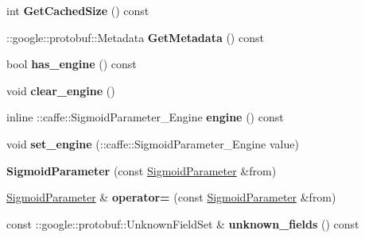 \begin{DoxyCompactItemize}
int {\bfseries Get\+Cached\+Size} () const
\item 
\mbox{\label{classcaffe_1_1_sigmoid_parameter_a2b3a653a54f11702c7f79e3bed8c89cb}} 
\+::google\+::protobuf\+::\+Metadata {\bfseries Get\+Metadata} () const
\item 
\mbox{\label{classcaffe_1_1_sigmoid_parameter_aeba70eb092ec6c6f8a6f11cd657e143a}} 
bool {\bfseries has\+\_\+engine} () const
\item 
\mbox{\label{classcaffe_1_1_sigmoid_parameter_ab72d71d79d429c9d44caaf5b04d416d6}} 
void {\bfseries clear\+\_\+engine} ()
\item 
\mbox{\label{classcaffe_1_1_sigmoid_parameter_ac78bd9e1972d5a975b813963732ba9e7}} 
inline \+::caffe\+::\+Sigmoid\+Parameter\+\_\+\+Engine {\bfseries engine} () const
\item 
\mbox{\label{classcaffe_1_1_sigmoid_parameter_a0a6e99825d8d1c37d639ecb4d7f2076a}} 
void {\bfseries set\+\_\+engine} (\+::caffe\+::\+Sigmoid\+Parameter\+\_\+\+Engine value)
\item 
\mbox{\label{classcaffe_1_1_sigmoid_parameter_af89f84687c02c29e0fef17f4d78ea37e}} 
{\bfseries Sigmoid\+Parameter} (const \mbox{\hyperlink{classcaffe_1_1_sigmoid_parameter}{Sigmoid\+Parameter}} \&from)
\item 
\mbox{\label{classcaffe_1_1_sigmoid_parameter_ac819b7f4f559ad9ecad92d5bd06bb740}} 
\mbox{\hyperlink{classcaffe_1_1_sigmoid_parameter}{Sigmoid\+Parameter}} \& {\bfseries operator=} (const \mbox{\hyperlink{classcaffe_1_1_sigmoid_parameter}{Sigmoid\+Parameter}} \&from)
\item 
\mbox{\label{classcaffe_1_1_sigmoid_parameter_a78f7e6e93d9d060f0f364381f42397a0}} 
const \+::google\+::protobuf\+::\+Unknown\+Field\+Set \& {\bfseries unknown\+\_\+fields} () const
\item 
\mbox{\label{classcaffe_1_1_sigmoid_parameter_a8ef33f71cbfba0be0d4553b175af05ba}} 

\end{DoxyCompactItemize}
